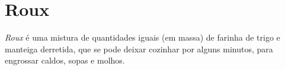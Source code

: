 \section{Roux}

\emph{Roux} é uma mistura de quantidades iguais
(em massa) de farinha de trigo e manteiga
derretida, que se pode deixar cozinhar por
alguns minutos, para engrossar caldos, sopas e
molhos.
